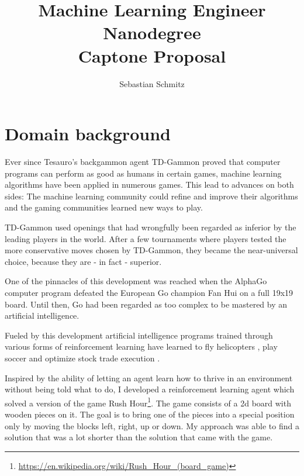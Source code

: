 \documentclass[a4paper,10pt]{article}
\title{Machine Learning Engineer Nanodegree\\Captone Proposal}
\author{Sebastian Schmitz}
\begin{document}
\maketitle
\clearpage

\section{Domain background}
% 
% 
Ever since Tesauro's backgammon agent TD-Gammon \cite{Tesauro:1995:TDL:203330.203343} proved that computer programs can perform as good as humans in certain games, machine learning algorithms have been applied in numerous games.
This lead to advances on both sides: The machine learning community could refine and improve their algorithms and the gaming communities learned new ways to play.

TD-Gammon used openings that had wrongfully been regarded as inferior by the leading players in the world. 
After a few tournaments where players tested the more conservative moves chosen by TD-Gammon, they became the near-universal choice, because they are - in fact - superior\cite{TDGammonArticle}.

One of the pinnacles of this development was reached when the AlphaGo computer program defeated the European Go champion Fan Hui on a full 19x19 board\cite{AlphaGoBeatsFanHui}. Until then, Go\cite{GoWiki} had been regarded as too complex to be mastered by an artificial intelligence.

Fueled by this development artificial intelligence programs trained through various forms of reinforcement learning\cite{ReinforcementLearningWiki} have learned to fly helicopters \cite{NIPS2006_3151}, play soccer \cite{Merke2002} and optimize stock trade execution \cite{Nevmyvaka:2006:RLO:1143844.1143929}.

Inspired by the ability of letting an agent learn how to thrive in an environment without being told what to do, I developed a reinforcement learning agent which solved a version of the game Rush Hour\footnote{\url{https://en.wikipedia.org/wiki/Rush_Hour_(board_game)}}.
The game consists of a 2d board with wooden pieces on it. The goal is to bring one of the pieces into a special position only by moving the blocks left, right, up or down.
My approach was able to find a solution that was a lot shorter than the solution that came with the game.
\end{document}
